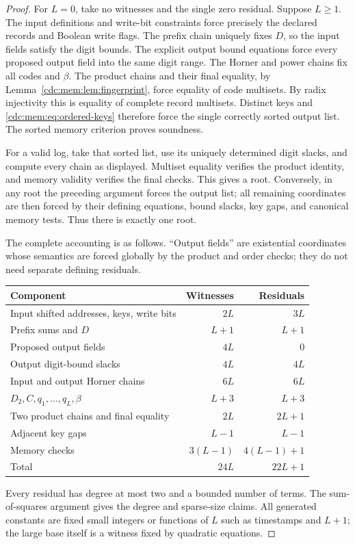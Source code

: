 \documentclass[11pt,a4paper]{article}
\theoremstyle{definition}
\theoremstyle{remark}
\begin{document}
\begin{proof}
For $L=0$, take no witnesses and the single zero residual. Suppose $L\geq1$.
The input definitions and write-bit constraints force precisely the declared
records and Boolean write flags. The prefix chain uniquely fixes $D$, so the
input fields satisfy the digit bounds. The explicit output bound equations
force every proposed output field into the same digit range. The Horner and
power chains fix all codes and $\beta$. The product chains and their final
equality, by Lemma~\ref{cdc:mem:lem:fingerprint}, force equality of code multisets.
By radix injectivity this is equality of complete record multisets. Distinct
keys and \eqref{cdc:mem:eq:ordered-keys} therefore force the single correctly sorted
output list. The sorted memory criterion proves soundness.

For a valid log, take that sorted list, use its uniquely determined digit
slacks, and compute every chain as displayed. Multiset equality verifies the
product identity, and memory validity verifies the final checks. This gives a
root. Conversely, in any root the preceding argument forces the output list;
all remaining coordinates are then forced by their defining equations, bound
slacks, key gaps, and canonical memory tests. Thus there is exactly one root.

The complete accounting is as follows. ``Output fields'' are existential
coordinates whose semantics are forced globally by the product and order
checks; they do not need separate defining residuals.
\begin{center}
\begin{tabular}{@{}lrr@{}}
\toprule
Component & Witnesses & Residuals\\
\midrule
Input shifted addresses, keys, write bits & $2L$ & $3L$\\
Prefix sums and $D$ & $L+1$ & $L+1$\\
Proposed output fields & $4L$ & $0$\\
Output digit-bound slacks & $4L$ & $4L$\\
Input and output Horner chains & $6L$ & $6L$\\
$D_2,C,q_1,\ldots,q_L,\beta$ & $L+3$ & $L+3$\\
Two product chains and final equality & $2L$ & $2L+1$\\
Adjacent key gaps & $L-1$ & $L-1$\\
Memory checks & $3(L-1)$ & $4(L-1)+1$\\
\midrule
Total & $24L$ & $22L+1$\\
\bottomrule
\end{tabular}
\end{center}
Every residual has degree at most two and a bounded number of terms. The
sum-of-squares argument gives the degree and sparse-size claims. All generated
constants are fixed small integers or functions of $L$ such as timestamps and
$L+1$; the large base itself is a witness fixed by quadratic equations.
\end{proof}
\end{document}
